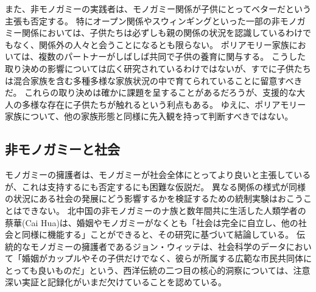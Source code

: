 \documentclass[paper=a4,book,openany]{jlreq}
\begin{document}
また、非モノガミーの実践者は、モノガミー関係が子供にとってベターだという主張も否定する。
特にオープン関係やスウィンギングといった一部の非モノガミー関係においては、子供たちは必ずしも親の関係の状況を認識しているわけでもなく、関係外の人々と会うことになるとも限らない。
ポリアモリー家族においては、複数のパートナーがしばしば共同で子供の養育に関与する。
こうした取り決めの影響については広く研究されているわけではないが、すでに子供たちは混合家族を含む多種多様な家族状況の中で育てられていることに留意すべきだ。
これらの取り決めは確かに課題を呈することがあるだろうが、支援的な大人の多様な存在に子供たちが触れるという利点もある。
ゆえに、ポリアモリー家族について、他の家族形態と同様に先入観を持って判断すべきではない\citep[p.191]{sheff15:_polyam_next_door}。

\subsection{非モノガミーと社会}

モノガミーの擁護者は、モノガミーが社会全体にとってより良いと主張しているが、これは支持するにも否定するにも困難な仮説だ。
異なる関係の様式が同様の状況にある社会の発展にどう影響するかを検証するための統制実験はおこうことはできない。
北中国の非モノガミーのナ族と数年間共に生活した人類学者の蔡華(Cai Hua)は、婚姻やモノガミーがなくとも「社会は完全に自立し、他の社会と同様に機能する」ことができると、その研究に基づいて結論している\citep{hua03:_societ_without_father_husban}。
伝統的なモノガミーの擁護者であるジョン・ウィッテは、社会科学のデータにおいて「婚姻がカップルやその子供だけでなく、彼らが所属する広範な市民共同体にとっても良いものだ」という、西洋伝統の二つ目の核心的洞察については、注意深い実証と記録化がいまだ欠けていることを認めている\citep[p.1070]{witte01:_goods_goals_marriag}。
\end{document}
